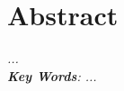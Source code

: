 \documentclass[main]{subfiles}
\begin{document}
\chapter*{\centering Abstract}

\textit{
    ...
 \\   
\textbf{Key Words}: ... 
}
\end{document}
